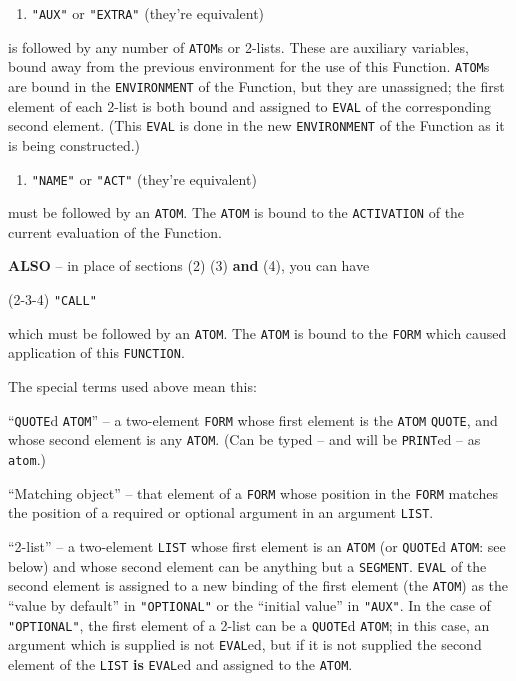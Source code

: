 \documentclass[a4paper,]{article}
\providecommand{\tightlist}{%
  \setlength{\itemsep}{0pt}\setlength{\parskip}{0pt}}
\begin{document}
\begin{enumerate}
\def\labelenumi{(\arabic{enumi})}
\setcounter{enumi}{4}
\tightlist
\item
  \texttt{"AUX"} or \texttt{"EXTRA"}   (they're equivalent)
\end{enumerate}

is followed by any number of \texttt{ATOM}s or 2-lists. These are auxiliary variables, bound away from the previous
environment for the use of this Function. \texttt{ATOM}s are bound in the \texttt{ENVIRONMENT} of the Function, but they
are unassigned; the first element of each 2-list is both bound and assigned to \texttt{EVAL} of the corresponding second
element. (This \texttt{EVAL} is done in the new \texttt{ENVIRONMENT} of the Function as it is being constructed.)

\begin{enumerate}
\def\labelenumi{(\arabic{enumi})}
\setcounter{enumi}{5}
\tightlist
\item
  \texttt{"NAME"}  or \texttt{"ACT"}  (they're equivalent)
\end{enumerate}

must be followed by an \texttt{ATOM}. The \texttt{ATOM} is bound to the \texttt{ACTIVATION} of the current evaluation of
the Function.

\textbf{ALSO} -- in place of sections (2) (3) \textbf{and} (4), you can have 

(2-3-4) \texttt{"CALL"}

which must be followed by an \texttt{ATOM}. The \texttt{ATOM} is bound to the \texttt{FORM} which caused application of
this \texttt{FUNCTION}.

The special terms used above mean this:

``\texttt{QUOTE}d \texttt{ATOM}'' -- a two-element \texttt{FORM} whose first element is the \texttt{ATOM} \texttt{QUOTE},
and whose second element is any \texttt{ATOM}. (Can be typed -- and will be \texttt{PRINT}ed -- as
\texttt{\textquotesingle{}atom}.)

``Matching object'' -- that element of a \texttt{FORM} whose position in the \texttt{FORM} matches the position of a
required or optional argument in an argument \texttt{LIST}.

``2-list'' -- a two-element \texttt{LIST} whose first element is an \texttt{ATOM} (or \texttt{QUOTE}d \texttt{ATOM}: see
below) and whose second element can be anything but a \texttt{SEGMENT}. \texttt{EVAL} of the second element is assigned to
a new binding of the first element (the \texttt{ATOM}) as the ``value by default'' in \texttt{"OPTIONAL"} or the ``initial
value'' in \texttt{"AUX"}. In the case of \texttt{"OPTIONAL"}, the first element of a 2-list can be a \texttt{QUOTE}d
\texttt{ATOM}; in this case, an argument which is supplied is not \texttt{EVAL}ed, but if it is not supplied the second
element of the \texttt{LIST} \textbf{is} \texttt{EVAL}ed and assigned to the \texttt{ATOM}.
\end{document}
